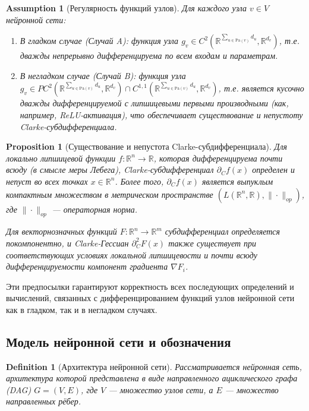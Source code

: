 \documentclass[11pt]{article}
\newtheorem{definition}{Definition}
\newtheorem{proposition}{Proposition}
\newtheorem{assumption}{Assumption}
\newcommand{\Pa}{\mathrm{Pa}} %
\begin{document}
\begin{assumption}[Регулярность функций узлов]
  \label{ass:regularity}
  Для каждого узла $v \in V$ нейронной сети:
  \begin{enumerate}
    \item В гладком случае (Случай A): функция узла $g_v \in C^2(\mathbb{R}^{\sum_{u\in\Pa(v)} d_u},
      \mathbb{R}^{d_v})$, т.е.
      дважды непрерывно дифференцируема по всем входам и параметрам.
    \item В негладком случае (Случай B): функция узла $g_v \in PC^2(\mathbb{R}^{\sum_{u\in\Pa(v)} d_u},
      \mathbb{R}^{d_v}) \cap
      C^{1,1}(\mathbb{R}^{\sum_{u\in\Pa(v)} d_u}, \mathbb{R}^{d_v})$, т.е. является кусочно дважды
      дифференцируемой с липшицевыми
      первыми производными (как, например, ReLU-активация), что обеспечивает существование и непустоту
      Clarke-субдифференциала.
  \end{enumerate}
\end{assumption}

\begin{proposition}[Существование и непустота Clarke-субдифференциала]
  \label{prop:clarke_existence}
  Для локально липшицевой функции $f: \mathbb{R}^n \to \mathbb{R}$, которая дифференцируема почти всюду (в
  смысле меры Лебега), Clarke-субдифференциал $\partial_C f(x)$ определен и непуст во всех точках $x \in
  \mathbb{R}^n$. Более того, $\partial_C f(x)$ является выпуклым компактным множеством в метрическом
  пространстве $(L(\mathbb{R}^n, \mathbb{R}), \|\cdot\|_{op})$, где $\|\cdot\|_{op}$ — операторная норма.

  Для векторнозначных функций $F: \mathbb{R}^n \to \mathbb{R}^m$ субдифференциал определяется покомпонентно,
  и Clarke-Гессиан $\partial_C^2 F(x)$ также существует при соответствующих условиях локальной липшицевости и
  почти всюду дифференцируемости компонент градиента $\nabla F_i$.
\end{proposition}

Эти предпосылки гарантируют корректность всех последующих определений и вычислений, связанных с
дифференцированием функций узлов нейронной сети как в гладком, так и в негладком случаях.

\subsection{Модель нейронной сети и обозначения}

\begin{definition}[Архитектура нейронной сети]
  Рассматривается нейронная сеть, архитектура которой представлена в виде направленного ациклического графа
  (DAG) $G = (V, E)$, где $V$ — множество узлов сети, а $E$ — множество направленных рёбер.
\end{definition}
\end{document}
